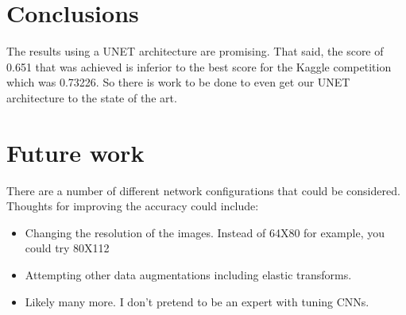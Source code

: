 \documentclass[letterpaper]{article}
\begin{document}
\section{Conclusions}
The results using a UNET architecture are promising. That said, the score of 0.651 that was achieved is inferior to the best score for the Kaggle competition which was 0.73226. So there is work to be done to even get our UNET architecture to the state of the art. 

\section{Future work}
There are a number of different network configurations that could be considered. Thoughts for improving the accuracy could include:
\begin{itemize}
  \item Changing the resolution of the images. Instead of 64X80 for example, you could try 80X112
  \item Attempting other data augmentations including elastic transforms. 
  \item Likely many more. I don't pretend to be an expert with tuning CNNs.
  
\end{itemize}


\end{document}
